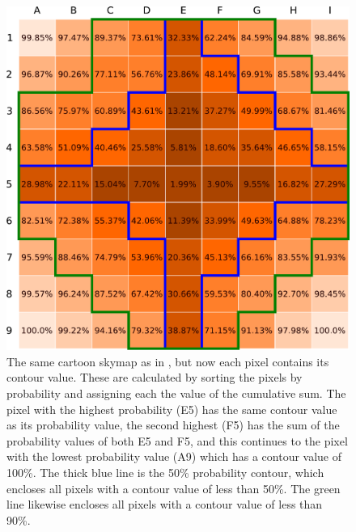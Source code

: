 \begin{colsection}
\begin{colsection}
\begin{figure}[p]
    \begin{center}
        \includegraphics[width=0.95\linewidth]{images/sim/sim_skymap_conts.pdf}
    \end{center}
    \caption[An example 2D skymap with pixel contour values]{
        The same cartoon skymap as in , but now each pixel contains its contour value. These are calculated by sorting the pixels by probability and assigning each the value of the cumulative sum. The pixel with the highest probability (E5) has the same contour value as its probability value, the second highest (F5) has the sum of the probability values of both E5 and F5, and this continues to the pixel with the lowest probability value (A9) which has a contour value of 100\%. The thick blue line is the 50\% probability contour, which encloses all pixels with a contour value of less than 50\%. The green line likewise encloses all pixels with a contour value of less than 90\%.
    }\label{fig:sim_skymap_conts}
\end{figure}

\end{colsection}


\end{colsection}


